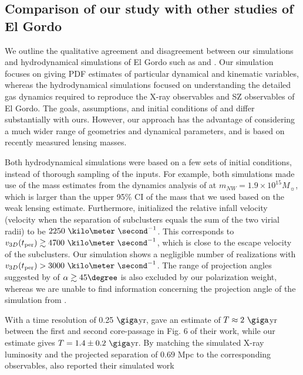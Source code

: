\documentclass[ucdthesis.tex]{subfiles}
\begin{document}
    \subsection{Comparison of our study with other studies of El Gordo}
    We outline the qualitative agreement and disagreement between our
    simulations and hydrodynamical simulations of El Gordo such as
    \cite{Donnert13} and \cite{Molnar14}. Our simulation focuses on giving PDF
    estimates of particular dynamical and kinematic variables, whereas the
    hydrodynamical simulations focused on understanding the detailed gas dynamics
    required to reproduce the X-ray observables and SZ 
    observables of El Gordo. The goals,
    assumptions, and initial conditions of \cite{Donnert13} and \cite{Molnar14}
    differ substantially with ours. However, our approach has the advantage of considering a much wider range of geometries and dynamical parameters, and is based on recently measured lensing masses.
    \par 
    Both hydrodynamical simulations were based on a few sets of initial
    conditions, instead of thorough sampling of the inputs. For example, both
    simulations made use of the mass estimates from the dynamics analysis
    of  at $m_{NW} = 1.9 \times
    10^{15} M_{\sun}$,
    which is larger than the upper 95\% CI of the mass that we used based on
    the weak lensing estimate.
    Furthermore, \cite{Molnar14} initialized the relative infall velocity
    (velocity when the separation of subclusters equals the sum of the two virial
    radii) to be $2250~\kilo \meter~ \second^{-1}$. This corresponds to
    $v_{3D}(t_{\rm per}) \gtrsim 4700~\kilo \meter~\second^{-1}$, which is close to
    the escape velocity of the subclusters. 
    Our simulation shows 
    a negligible number of realizations with $v_{3D}(t_{\rm per}) >
    3000~\kilo\meter~\second^{-1}$. 
    The range of projection angles suggested by
    \cite{Molnar14} of $\alpha \gtrsim 45\degree$ is also excluded by our
    polarization weight, whereas we are unable to find information concerning
    the projection angle of the simulation from \cite{Donnert13}.\par 
    With a time resolution of 0.25 $\giga$yr,
    \cite{Donnert13} gave an estimate of  $T\approx 2~\giga$yr between the
    first and second core-passage in Fig. 6 of their work, while our estimate gives $T
    = 1.4\pm {0.2}~\giga$yr. 
    By matching the simulated X-ray luminosity and the projected separation
    of $0.69$ Mpc to the corresponding observables, \cite{Donnert13} also reported their simulated work 
\end{document}
